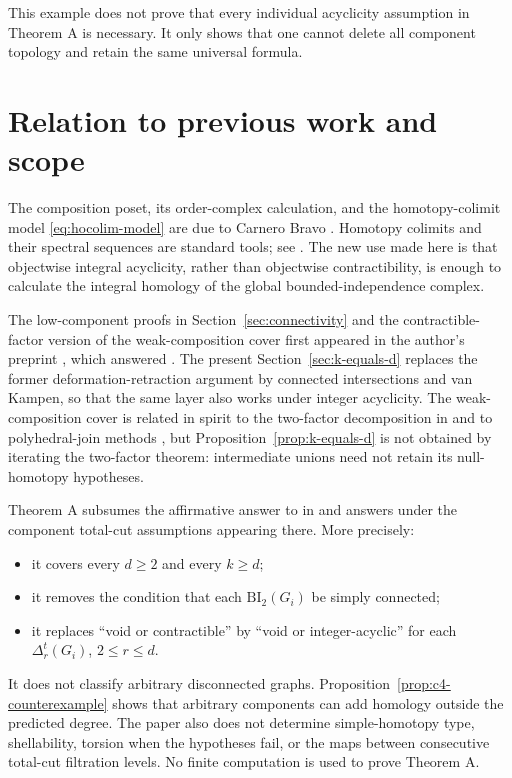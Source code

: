 \documentclass[11pt]{article}
\theoremstyle{remark}
\numberwithin{equation}{section}
\begin{document}
This example does not prove that every individual acyclicity assumption in
Theorem A is necessary. It only shows that one cannot delete all component
topology and retain the same universal formula.

\section{Relation to previous work and scope}\label{sec:scope}

The composition poset, its order-complex calculation, and the
homotopy-colimit model \eqref{eq:hocolim-model} are due to Carnero Bravo
\cite[Proposition 12, Lemma 25, and Corollary 27]{ref2}. Homotopy colimits and
their spectral sequences are standard tools; see \cite{ref5,ref6}. The new use
made here is that objectwise integral acyclicity, rather than objectwise
contractibility, is enough to calculate the integral homology of the global
bounded-independence complex.

The low-component proofs in Section~\ref{sec:connectivity} and the
contractible-factor version of the weak-composition cover first appeared in
the author's preprint \cite{ref8}, which answered \cite[Question 29]{ref2}.
The present Section~\ref{sec:k-equals-d} replaces the former
deformation-retraction argument by connected intersections and van Kampen, so
that the same layer also works under integer acyclicity. The weak-composition
cover is related in spirit to the two-factor decomposition in
\cite[Theorem 34]{ref2} and to polyhedral-join methods \cite{ref7}, but
Proposition~\ref{prop:k-equals-d} is not obtained by iterating the two-factor
theorem: intermediate unions need not retain its null-homotopy hypotheses.

Theorem A subsumes the affirmative answer to \cite[Question 29]{ref2} in
\cite{ref8} and answers \cite[Question 30]{ref2} under the component total-cut
assumptions appearing there. More precisely:
\begin{itemize}
\item it covers every $d\geq2$ and every $k\geq d$;
\item it removes the condition that each $\mathrm{BI}_2(G_i)$ be simply
connected;
\item it replaces ``void or contractible'' by ``void or integer-acyclic'' for
each $\Delta_r^t(G_i)$, $2\leq r\leq d$.
\end{itemize}

It does not classify arbitrary disconnected graphs.
Proposition~\ref{prop:c4-counterexample} shows that arbitrary components can
add homology outside the predicted degree. The paper also does not determine
simple-homotopy type, shellability, torsion when the hypotheses fail, or the
maps between consecutive total-cut filtration levels. No finite computation
is used to prove Theorem A.
\end{document}
